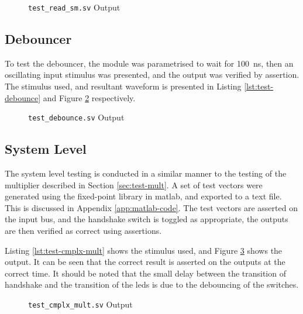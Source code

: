 
\begin{figure}[ht]
	\centering
	
	\caption{\texttt{test\_read\_sm.sv} Output}
	\label{fig:test-read-sm}
\end{figure}

\FloatBarrier
\subsection{Debouncer}
To test the debouncer, the module was parametrised to wait for \SI{100}{\nano\second}, then an oscillating input stimulus was presented, and the output was verified by assertion. The stimulus used, and resultant waveform is presented in Listing \ref{lst:test-debounce} and Figure \ref{fig:test-debounce} respectively.



\begin{figure}[ht]
	\centering
	
	\caption{\texttt{test\_debounce.sv} Output}
	\label{fig:test-debounce}
\end{figure}

\FloatBarrier
\subsection{System Level}
The system level testing is conducted in a similar manner to the testing of the multiplier described in Section \ref{sec:test-mult}. A set of test vectors were generated using the fixed-point library in \gls{matlab}, and exported to a text file. This is discussed in Appendix \ref{app:matlab-code}. The test vectors are asserted on the input bus, and the handshake switch is toggled as appropriate, the outputs are then verified as correct using assertions.

Listing \ref{lst:test-cmplx-mult} shows the stimulus used, and Figure \ref{fig:test-cmplx-mult} shows the output. It can be seen that the correct result is asserted on the outputs at the correct time. It should be noted that the small delay between the transition of handshake and the transition of the \glspl{led} is due to the debouncing of the switches.


\begin{figure}[ht]
	\centering
	
	\caption{\texttt{test\_cmplx\_mult.sv} Output}
	\label{fig:test-cmplx-mult}
\end{figure}

